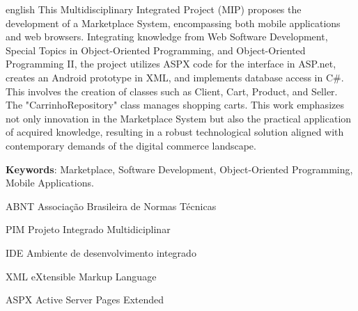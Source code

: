 \documentclass[
	12pt,				%
	openright,			%
	twoside,			%
	a4paper,			%
	english,			%
	brazil				%
	]{abntex2}
\newcommand{\listofquadrosname}{Lista de quadros}
\begin{document}
\begin{resumo}[Abstract]
 \begin{otherlanguage*}{english}
    This Multidisciplinary Integrated Project (MIP) proposes the development of a Marketplace System, encompassing both mobile applications and web browsers. Integrating knowledge from Web Software Development, Special Topics in Object-Oriented Programming, and Object-Oriented Programming II, the project utilizes ASPX code for the interface in ASP.net, creates an Android prototype in XML, and implements database access in C#. This involves the creation of classes such as Client, Cart, Product, and Seller. The "CarrinhoRepository" class manages shopping carts. This work emphasizes not only innovation in the Marketplace System but also the practical application of acquired knowledge, resulting in a robust technological solution aligned with contemporary demands of the digital commerce landscape.

   \vspace{\onelineskip}
 
   \noindent 
   \textbf{Keywords}: Marketplace, Software Development, Object-Oriented Programming, Mobile Applications.
 \end{otherlanguage*}
\end{resumo}



\tableofcontents*
\cleardoublepage


\listoffigures*
\cleardoublepage

\pdfbookmark[0]{\listofquadrosname}{loq}
\listofquadros*
\cleardoublepage

\listoftables*
\cleardoublepage

\begin{siglas}
  \item[ABNT] Associação Brasileira de Normas Técnicas
  \item[PIM] Projeto Integrado Multidiciplinar
  \item[IDE] Ambiente de desenvolvimento integrado
  \item[XML] eXtensible Markup Language
  \item[ASPX] Active Server Pages Extended
\end{siglas}
\end{document}

